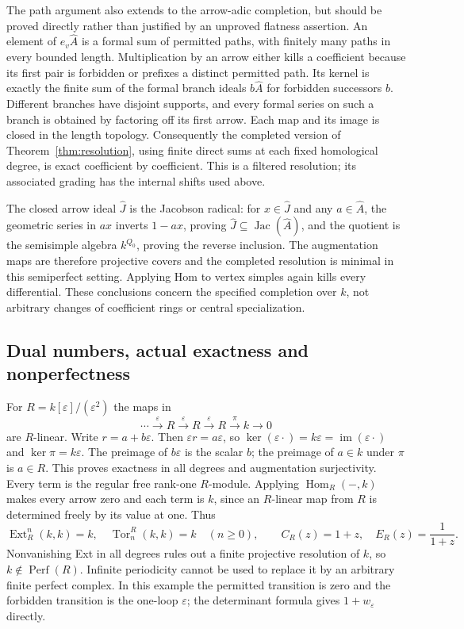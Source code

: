 The path argument also extends to the arrow-adic completion, but should be proved directly rather than justified by an unproved flatness assertion. An element of $e_v\widehat A$ is a formal sum of permitted paths, with finitely many paths in every bounded length. Multiplication by an arrow either kills a coefficient because its first pair is forbidden or prefixes a distinct permitted path. Its kernel is exactly the finite sum of the formal branch ideals $b\widehat A$ for forbidden successors $b$. Different branches have disjoint supports, and every formal series on such a branch is obtained by factoring off its first arrow. Each map and its image is closed in the length topology. Consequently the completed version of Theorem~\ref{thm:resolution}, using finite direct sums at each fixed homological degree, is exact coefficient by coefficient. This is a filtered resolution; its associated grading has the internal shifts used above.

The closed arrow ideal $\widehat J$ is the Jacobson radical: for $x\in\widehat J$ and any $a\in\widehat A$, the geometric series in $ax$ inverts $1-ax$, proving $\widehat J\subseteq\operatorname{Jac}(\widehat A)$, and the quotient is the semisimple algebra $k^{Q_0}$, proving the reverse inclusion. The augmentation maps are therefore projective covers and the completed resolution is minimal in this semiperfect setting. Applying Hom to vertex simples again kills every differential. These conclusions concern the specified completion over $k$, not arbitrary changes of coefficient rings or central specialization.

\subsection{Dual numbers, actual exactness and nonperfectness}
For $R=k[\varepsilon]/(\varepsilon^2)$ the maps in
\[
 \cdots\xrightarrow{\varepsilon}R\xrightarrow{\varepsilon}R
 \xrightarrow{\varepsilon}R\xrightarrow{\pi}k\longrightarrow0
\]
are $R$-linear. Write $r=a+b\varepsilon$. Then $\varepsilon r=a\varepsilon$, so $\ker(\varepsilon\cdot)=k\varepsilon=\operatorname{im}(\varepsilon\cdot)$ and $\ker\pi=k\varepsilon$. The preimage of $b\varepsilon$ is the scalar $b$; the preimage of $a\in k$ under $\pi$ is $a\in R$. This proves exactness in all degrees and augmentation surjectivity. Every term is the regular free rank-one $R$-module. Applying $\operatorname{Hom}_R(-,k)$ makes every arrow zero and each term is $k$, since an $R$-linear map from $R$ is determined freely by its value at one. Thus
\[
 \operatorname{Ext}^n_R(k,k)=k,\quad
 \operatorname{Tor}_n^R(k,k)=k\quad(n\geq0),\qquad
 C_R(z)=1+z,\quad E_R(z)=\frac1{1+z}.
\]
Nonvanishing Ext in all degrees rules out a finite projective resolution of $k$, so $k\notin\operatorname{Perf}(R)$. Infinite periodicity cannot be used to replace it by an arbitrary finite perfect complex. In this example the permitted transition is zero and the forbidden transition is the one-loop $\varepsilon$; the determinant formula gives $1+w_\varepsilon$ directly.


